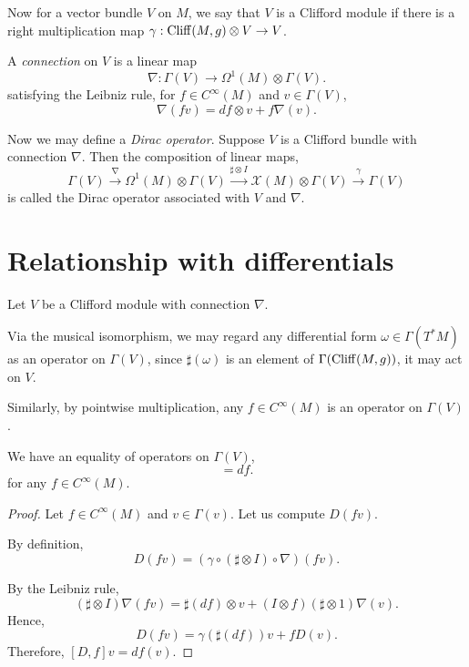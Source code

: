 Now for a vector bundle $V$ on $M$, we say that $V$ is a Clifford module
if there is a right multiplication map $\gamma:\operatorname{Cliff}(M,g) \otimes V\rightarrow V$. 

A \emph{connection} on $V$ is a linear map
\begin{equation}
    \nabla:\Gamma(V)\rightarrow \Omega^1(M)\otimes \Gamma(V).
\end{equation}
satisfying the Leibniz rule, for $f \in C^\infty(M)$ and $v \in \Gamma(V)$,
\begin{equation}
    \nabla(fv) = df \otimes v +f\nabla(v).
\end{equation}

Now we may define a \emph{Dirac operator}. Suppose $V$
is a Clifford bundle with connection $\nabla$. Then the composition of linear maps,
\begin{equation}
    \Gamma(V) \xrightarrow{\nabla} \Omega^1(M) \otimes \Gamma(V) \xrightarrow{\sharp\otimes I} \mathcal{X}(M)\otimes \Gamma(V) \xrightarrow{\gamma} \Gamma(V)
\end{equation}
is called the Dirac operator associated with $V$ and $\nabla$. 

\section{Relationship with differentials}
Let $V$ be a Clifford module with connection $\nabla$.

Via the musical isomorphism, we may regard any differential form $\omega \in \Gamma(T^*M)$
as an operator on $\Gamma(V)$, since $\sharp(\omega)$ is an element of $\Gamma(\operatorname{Cliff}(M,g))$,
it may act on $V$.

Similarly, by pointwise multiplication, any $f \in C^\infty(M)$ is an operator
on $\Gamma(V)$. 
\begin{theorem}
    We have an equality of operators on $\Gamma(V)$,
    \begin{equation}
        [D,f] = df.
    \end{equation}
    for any $f \in C^\infty(M)$.
\end{theorem}
\begin{proof}
    Let $f \in C^\infty(M)$ and $v \in \Gamma(v)$. Let 
    us compute $D(fv)$.
    
    By definition,
    \begin{equation}
        D(fv) = (\gamma\circ(\sharp\otimes I)\circ\nabla)(fv).
    \end{equation}
    
    By the Leibniz rule,
    \begin{equation}
        (\sharp\otimes I)\nabla(fv) = \sharp(df)\otimes v + (I\otimes f)(\sharp \otimes 1)\nabla(v).
    \end{equation}
    Hence,
    \begin{equation}
        D(fv) = \gamma(\sharp(df))v + fD(v).
    \end{equation}
    Therefore, $[D,f]v = df(v)$.
\end{proof}
